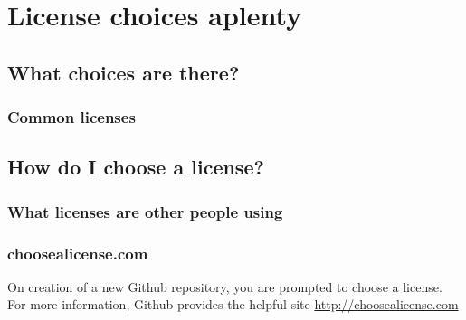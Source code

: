 \documentclass{beamer}
\begin{document}
	\section{License choices aplenty}
	\subsection{What choices are there?}
	\begin{frame}
		\frametitle{Common licenses}
		
	\end{frame}
	\subsection{How do I choose a license?}
	\begin{frame}
		\frametitle{What licenses are other people using}
		
	\end{frame}
	\begin{frame}
		\frametitle{choosealicense.com}
		On creation of a new Github repository, you are prompted to choose a license. For more information, Github provides the helpful site \url{http://choosealicense.com}
	\end{frame}
\end{document}
